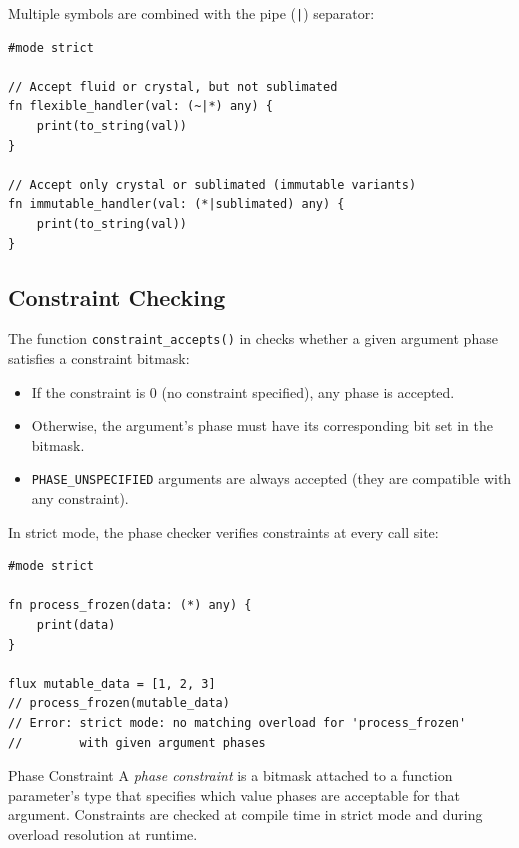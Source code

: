 Multiple symbols are combined with the pipe (\lstinline{|}) separator:

\begin{lstlisting}[language=Lattice, caption={Composite phase constraints}]
#mode strict

// Accept fluid or crystal, but not sublimated
fn flexible_handler(val: (~|*) any) {
    print(to_string(val))
}

// Accept only crystal or sublimated (immutable variants)
fn immutable_handler(val: (*|sublimated) any) {
    print(to_string(val))
}
\end{lstlisting}

\subsection{Constraint Checking}

The function \lstinline|constraint_accepts()| in  checks whether a given argument phase satisfies a constraint bitmask:

\begin{itemize}
  \item If the constraint is 0 (no constraint specified), any phase is accepted.
  \item Otherwise, the argument's phase must have its corresponding bit set in the bitmask.
  \item \lstinline|PHASE_UNSPECIFIED| arguments are always accepted (they are compatible with any constraint).
\end{itemize}

In strict mode, the phase checker verifies constraints at every call site:

\begin{lstlisting}[language=Lattice, caption={Constraint violation in strict mode}]
#mode strict

fn process_frozen(data: (*) any) {
    print(data)
}

flux mutable_data = [1, 2, 3]
// process_frozen(mutable_data)
// Error: strict mode: no matching overload for 'process_frozen'
//        with given argument phases
\end{lstlisting}

\begin{defnbox}{Phase Constraint}
A \emph{phase constraint} is a bitmask attached to a function parameter's type that specifies which value phases are acceptable for that argument.
Constraints are checked at compile time in strict mode and during overload resolution at runtime.
\end{defnbox}

